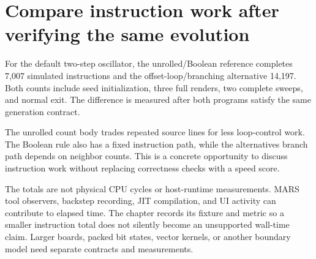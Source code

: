 \section{Compare instruction work after verifying the same
  evolution}\label{008-life-generations-p12-compare-instruction-work-after-verifying-the-same-evolution}

For the default two-step oscillator, the unrolled/Boolean reference
completes 7,007 simulated instructions and the offset-loop/branching
alternative 14,197. Both counts include seed initialization, three full
renders, two complete sweeps, and normal exit. The difference is
measured after both programs satisfy the same generation contract.

The unrolled count body trades repeated source lines for less
loop-control work. The Boolean rule also has a fixed instruction path,
while the alternative\textquotesingle s branch path depends on neighbor
counts. This is a concrete opportunity to discuss instruction work
without replacing correctness checks with a speed score.

The totals are not physical CPU cycles or host-runtime measurements.
MARS tool observers, backstep recording, JIT compilation, and UI
activity can contribute to elapsed time. The chapter records its fixture
and metric so a smaller instruction total does not silently become an
unsupported wall-time claim. Larger boards, packed bit states, vector
kernels, or another boundary model need separate contracts and
measurements.
